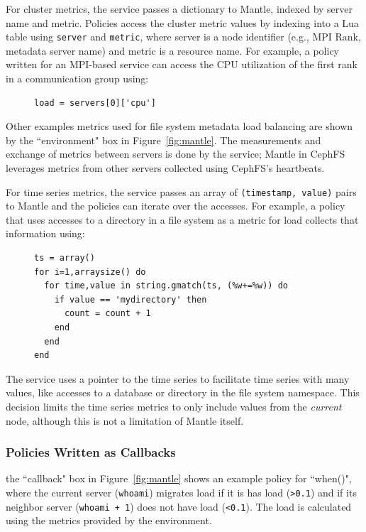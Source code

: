 For cluster metrics, the service passes a dictionary to Mantle, indexed by
server name and metric. Policies access the cluster metric values by indexing
into a Lua table using \texttt{server} and \texttt{metric}, where server is a
node identifier ({e.g.}, MPI Rank, metadata server name) and metric is a
resource name.  For example, a policy written for an MPI-based service can
access the CPU utilization of the first rank in a communication group using:

\begin{figure}[h]
\footnotesize
\begin{verbatim}
load = servers[0]['cpu']
\end{verbatim}
\end{figure}

Other examples metrics used for file system metadata load balancing are shown
by the ``environment" box in Figure~\ref{fig:mantle}. The measurements and
exchange of metrics between servers is done by the service; Mantle in CephFS
leverages metrics from other servers collected using CephFS's heartbeats.

For time series metrics, the service passes an array of \texttt{(timestamp,
value)} pairs to Mantle and the policies can iterate over the accesses. For
example, a policy that uses accesses to a directory in a file system as a
metric for load collects that information using:

\begin{figure}[h]
\footnotesize
\begin{verbatim}
ts = array()
for i=1,arraysize() do
  for time,value in string.gmatch(ts, (%w+=%w)) do
    if value == 'mydirectory' then
      count = count + 1
    end
  end
end
\end{verbatim}
\end{figure}

The service uses a pointer to the time series to facilitate time series with
many values, like accesses to a database or directory in the file system
namespace. This decision limits the time series metrics to only include values
from the {\it current } node, although this is not a limitation of Mantle
itself.



\subsubsection{Policies Written as Callbacks} the ``callback" box in
Figure~\ref{fig:mantle} shows an example policy for ``when()", where the
current server (\texttt{whoami}) migrates load if it is has load
(\texttt{>0.1}) and if its neighbor server (\texttt{whoami + 1}) does not have
load (\texttt{<0.1}). The load is calculated using the metrics provided by the
environment.

